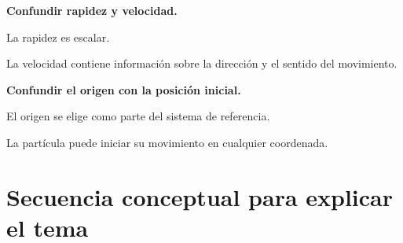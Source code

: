 \begin{errorfrecuente}
\textbf{Confundir rapidez y velocidad.}

La rapidez es escalar.

La velocidad contiene información sobre la dirección y el sentido del
movimiento.
\end{errorfrecuente}

\begin{errorfrecuente}
\textbf{Confundir el origen con la posición inicial.}

El origen se elige como parte del sistema de referencia.

La partícula puede iniciar su movimiento en cualquier coordenada.
\end{errorfrecuente}


\section{Secuencia conceptual para explicar el tema}

